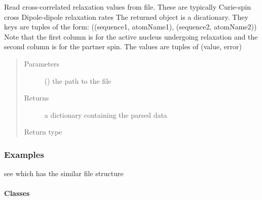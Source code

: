 \documentclass[a4paper,10pt,english,openany,oneside]{sphinxmanual}
\begin{document}
\begin{fulllineitems}
\label{\detokenize{reference/generated/paramagpy.dataparse.read_ccr:paramagpy.dataparse.read_ccr}}
Read cross-correlated relaxation values from file.
These are typically Curie-spin cross Dipole-dipole relaxation rates
The returned object is a dicationary.
They keys are tuples of the form:
((sequence1, atomName1), (sequence2, atomName2))
Note that the first column is for the active nucleus undergoing
relaxation and the second column is for the partner spin.
The values are tuples of (value, error)
\begin{quote}\begin{description}
\item[{Parameters}] \leavevmode
{} () \textendash{} the path to the file

\item[{Returns}] \leavevmode
{} \textendash{} a dictionary containing the parsed data

\item[{Return type}] \leavevmode
{\hyperref[\detokenize{reference/generated/paramagpy.dataparse.DataContainer:paramagpy.dataparse.DataContainer}]{}}

\end{description}\end{quote}
\subsubsection*{Examples}

see {\hyperref[\detokenize{reference/generated/paramagpy.dataparse.read_rdc:paramagpy.dataparse.read_rdc}]{}} which has the similar file structure

\end{fulllineitems}



\paragraph{Classes}
\label{\detokenize{reference/dataparse:classes}}
\end{document}
